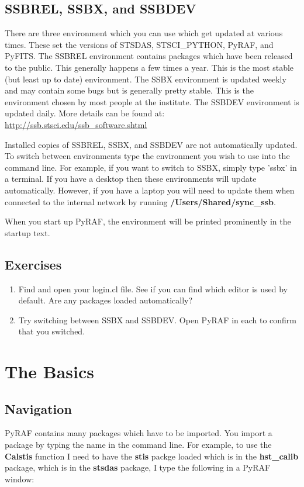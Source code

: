 \subsection{SSBREL, SSBX, and SSBDEV}
There are three environment which you can use which get updated at various times. These set the versions of STSDAS, STSCI\_PYTHON, PyRAF, and PyFITS. The SSBREL environment contains packages which have been released to the public. This generally happens a few times a year. This is the most stable (but least up to date) environment. The SSBX environment is updated weekly and may contain some bugs but is generally pretty stable. This is the environment chosen by most people at the institute. The SSBDEV environment is updated daily. More details can be found at: \url{http://ssb.stsci.edu/ssb_software.shtml}

Installed copies of SSBREL, SSBX, and SSBDEV are not automatically updated.  To switch between environments type the environment you wish to use into the command line. For example, if you want to switch to SSBX, simply type 'ssbx' in a terminal. If you have a desktop then these environments will update automatically. However, if you have a laptop you will need to update them when connected to the internal network by running {\bf /Users/Shared/sync\_ssb}.

When you start up PyRAF, the environment will be printed prominently in the startup text.

\subsection{Exercises}
\begin{enumerate}
\item Find and open your login.cl file.  See if you can find which editor is used by default. Are any packages loaded automatically? 
\item Try switching between SSBX and SSBDEV. Open PyRAF in each to confirm that you switched.
\end{enumerate}

\section{The Basics}
\subsection{Navigation}
PyRAF contains many packages which have to be imported. You import a package by typing the name in the command line. For example, to use the {\bf Calstis} function I need to have the {\bf stis} packge loaded which is in the {\bf hst\_calib} package, which is in the {\bf stsdas} package,  I type the following in a PyRAF window:

